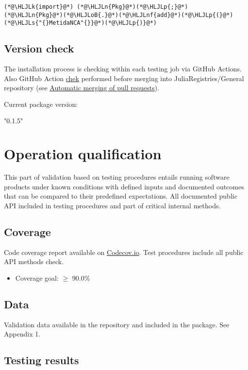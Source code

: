 \documentclass[12pt,a4paper]{article}
\newcommand{\HLJLk}[1]{\textcolor[RGB]{148,91,176}{\textbf{#1}}}
\newcommand{\HLJLn}[1]{#1}
\newcommand{\HLJLnf}[1]{\textcolor[RGB]{66,102,213}{#1}}
\newcommand{\HLJLs}[1]{\textcolor[RGB]{201,61,57}{#1}}
\newcommand{\HLJLoB}[1]{\textcolor[RGB]{102,102,102}{\textbf{#1}}}
\newcommand{\HLJLp}[1]{#1}
\begin{document}
\begin{lstlisting}
(*@\HLJLk{import}@*) (*@\HLJLn{Pkg}@*)(*@\HLJLp{;}@*) (*@\HLJLn{Pkg}@*)(*@\HLJLoB{.}@*)(*@\HLJLnf{add}@*)(*@\HLJLp{(}@*)(*@\HLJLs{"{}MetidaNCA"{}}@*)(*@\HLJLp{)}@*)
\end{lstlisting}

\subsection{Version check}
The installation process is checking within each testing job via GitHub Actions. Also GitHub Action \href{https://github.com/JuliaRegistries/General/blob/master/.github/workflows/automerge.yml}{chek} performed before merging into JuliaRegistries/General repository (see \href{https://github.com/JuliaRegistries/General#automatic-merging-of-pull-requests}{Automatic merging of pull requests}).



Current package version:


"0.1.5"


\section{Operation qualification}
This part of validation based on testing procedures entails running software products under known conditions with defined inputs and documented outcomes that can be compared to their predefined expectations. All documented public API included in testing procedures and part of critical internal methods.

\subsection{Coverage}
Code coverage report available on \href{https://app.codecov.io/gh/PharmCat/MetidaNCA.jl}{Codecov.io}. Test procedures include all  public API methods check.

\begin{itemize}
\item Coverage goal: \ensuremath{\geq} 90.0\%

\end{itemize}
\subsection{Data}
Validation data available in the repository and included in the package. See Appendix 1.

\subsection{Testing results}
\end{document}
